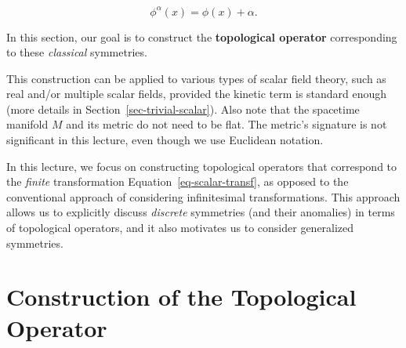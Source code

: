 \documentclass[
  letterpaper,
  DIV=11,
  numbers=noendperiod]{scrreport}
\begin{document}
\[
\phi^{\alpha}(x) = \phi(x) + \alpha.
\]

In this section, our goal is to construct the \textbf{topological
operator} corresponding to these \emph{classical} symmetries.

\begin{tcolorbox}[enhanced jigsaw, left=2mm, toprule=.15mm, bottomtitle=1mm, titlerule=0mm, leftrule=.75mm, colframe=quarto-callout-note-color-frame, opacitybacktitle=0.6, title=\textcolor{quarto-callout-note-color}{\faInfo}\hspace{0.5em}{Note}, bottomrule=.15mm, breakable, arc=.35mm, toptitle=1mm, colbacktitle=quarto-callout-note-color!10!white, rightrule=.15mm, opacityback=0, coltitle=black, colback=white]

This construction can be applied to various types of scalar field
theory, such as real and/or multiple scalar fields, provided the kinetic
term is standard enough (more details in
Section~\ref{sec-trivial-scalar}). Also note that the spacetime manifold
\(M\) and its metric do not need to be flat. The metric's signature is
not significant in this lecture, even though we use Euclidean notation.

\end{tcolorbox}

\begin{tcolorbox}[enhanced jigsaw, left=2mm, toprule=.15mm, bottomtitle=1mm, titlerule=0mm, leftrule=.75mm, colframe=quarto-callout-note-color-frame, opacitybacktitle=0.6, title=\textcolor{quarto-callout-note-color}{\faInfo}\hspace{0.5em}{Note}, bottomrule=.15mm, breakable, arc=.35mm, toptitle=1mm, colbacktitle=quarto-callout-note-color!10!white, rightrule=.15mm, opacityback=0, coltitle=black, colback=white]

In this lecture, we focus on constructing topological operators that
correspond to the \emph{finite} transformation
Equation~\ref{eq-scalar-transf}, as opposed to the conventional approach
of considering infinitesimal transformations. This approach allows us to
explicitly discuss \emph{discrete} symmetries (and their anomalies) in
terms of topological operators, and it also motivates us to consider
generalized symmetries.

\end{tcolorbox}

\section{Construction of the Topological
Operator}\label{construction-of-the-topological-operator}
\end{document}
